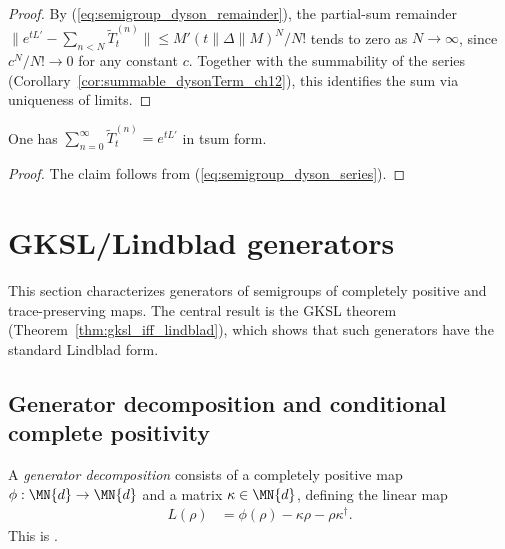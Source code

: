 \begin{proof}
    \leanok
    By (\ref{eq:semigroup_dyson_remainder}), the partial-sum remainder
    $\|e^{tL'}-\sum_{n<N}\widetilde{T}^{(n)}_t\|
        \le M'(t\|\Delta\|M)^N/N!$
    tends to zero as $N \to \infty$, since $c^N/N! \to 0$ for any
    constant $c$. Together with the summability of the series
    (Corollary~\ref{cor:summable_dysonTerm_ch12}), this identifies
    the sum via uniqueness of limits.
\end{proof}

\begin{corollary}
    \label{cor:tsum_dysonTerm_eq_ch12}
    \leanok
    One has $\sum_{n=0}^{\infty}\widetilde{T}^{(n)}_t = e^{tL'}$
    in tsum form.
\end{corollary}

\begin{proof}
    \leanok
    The claim follows from (\ref{eq:semigroup_dyson_series}).
\end{proof}

\section{GKSL/Lindblad generators}
\label{sec:gksl_generators}

This section characterizes generators of semigroups of completely
positive and trace-preserving maps.
The central result is the GKSL theorem
(Theorem~\ref{thm:gksl_iff_lindblad}),
which shows that such generators have the standard Lindblad form.

\subsection{Generator decomposition and conditional complete positivity}

\begin{definition}\label{def:generator_decomp}
    \leanok
    A \emph{generator decomposition} consists of a completely positive map
    $\phi : \MN{d} \to \MN{d}$ and a matrix $\kappa \in \MN{d}$, defining
    the linear map
    \begin{align}
        L(\rho)
        &= \phi(\rho) - \kappa\rho - \rho\kappa^\dagger.
        \label{eq:semigroup_generator_decomp}
    \end{align}
    This is \cite[Equation~(7.14)]{Wolf2012Quantum}.
\end{definition}

